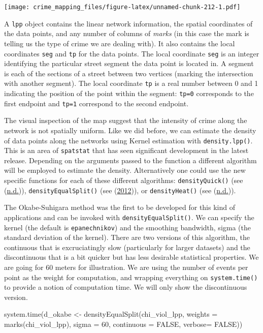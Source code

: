 \documentclass[
  krantz2]{krantz}
\makeatletter
\newenvironment{Shaded}{\begin{snugshade}}{\end{snugshade}}
\newcommand{\AttributeTok}[1]{\textcolor[rgb]{0.61,0.61,0.61}{#1}}
\newcommand{\ConstantTok}[1]{\textcolor[rgb]{0,0,0}{#1}}
\newcommand{\DecValTok}[1]{\textcolor[rgb]{0.06,0.06,0.06}{#1}}
\newcommand{\FunctionTok}[1]{\textcolor[rgb]{0,0,0}{#1}}
\newcommand{\NormalTok}[1]{#1}
\newcommand{\OtherTok}[1]{\textcolor[rgb]{0.37,0.37,0.37}{#1}}
\newenvironment{kframe}{%
\medskip{}
\setlength{\fboxsep}{.8em}
 \def\at@end@of@kframe{}%
 \ifinner\ifhmode%
  \def\at@end@of@kframe{\end{minipage}}%
  \begin{minipage}{\columnwidth}%
 \fi\fi%
 \def\FrameCommand##1{\hskip\@totalleftmargin \hskip-\fboxsep
 \colorbox{shadecolor}{##1}\hskip-\fboxsep
     \hskip-\linewidth \hskip-\@totalleftmargin \hskip\columnwidth}%
 \MakeFramed {\advance\hsize-\width
   \@totalleftmargin\z@ \linewidth\hsize
   \@setminipage}}%
 {\par\unskip\endMakeFramed%
 \at@end@of@kframe}
\renewenvironment{Shaded}{\begin{kframe}}{\end{kframe}}
\makeatother
\begin{document}
\texttt{[image: crime\_mapping\_files/figure-latex/unnamed-chunk-212-1.pdf]}

A \texttt{lpp} object contains the linear network information, the spatial coordinates of the data points, and any number of columns of \emph{marks} (in this case the mark is telling us the type of crime we are dealing with). It also contains the local coordinates \texttt{seg} and \texttt{tp} for the data points. The local coordinate \texttt{seg} is an integer identifying the particular street segment the data point is located in. A segment is each of the sections of a street between two vertices (marking the intersection with another segment). The local coordinate \texttt{tp} is a real number between 0 and 1 indicating the position of the point within the segment: \texttt{tp=0} corresponds to the first endpoint and \texttt{tp=1} correspond to the second endpoint.

The visual inspection of the map suggest that the intensity of crime along the network is not spatially uniform. Like we did before, we can estimate the density of data points along the networks using Kernel estimation with \texttt{density.lpp()}. This is an area of \texttt{spatstat} that has seen significant development in the latest release. Depending on the arguments passed to the function a different algorithm will be employed to estimate the density. Alternatively one could use the new specific functions for each of these different algorithms: \texttt{densityQuick()} (see (\protect\hyperlink{ref-Rakshit_2019}{n.d.})), \texttt{densityEqualSplit()} (see (\protect\hyperlink{ref-Okabe_2012}{2012})), or \texttt{densityHeat()} (see (\protect\hyperlink{ref-McSwiggan_2016}{n.d.})).

The Okabe-Suhigara method was the first to be developed for this kind of applications and can be invoked with \texttt{densityEqualSplit()}. We can specify the kernel (the default is \texttt{epanechnikov}) and the smoothing bandwidth, sigma (the standard deviation of the kernel). There are two versions of this algorithm, the continuous that is excruciatingly slow (particularly for larger datasets) and the discontinuous that is a bit quicker but has less desirable statistical properties. We are going for 60 meters for illustration. We are using the number of events per point as the weight for computation, and wrapping everything on \texttt{system.time()} to provide a notion of computation time. We will only show the discontinuous version.

\begin{Shaded}
\begin{Highlighting}[]
\FunctionTok{system.time}\NormalTok{(d\_okabe }\OtherTok{\textless{}{-}} \FunctionTok{densityEqualSplit}\NormalTok{(chi\_viol\_lpp, }
                                         \AttributeTok{weights =} \FunctionTok{marks}\NormalTok{(chi\_viol\_lpp), }
                                         \AttributeTok{sigma =} \DecValTok{60}\NormalTok{,}
                                         \AttributeTok{continuous =} \ConstantTok{FALSE}\NormalTok{,}
                                         \AttributeTok{verbose=} \ConstantTok{FALSE}\NormalTok{))}
\end{Highlighting}
\end{Shaded}
\end{document}
